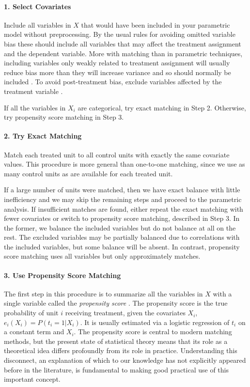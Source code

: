 \documentclass[11pt,titlepage]{article}
\begin{document}
\paragraph{1. Select Covariates}  
Include all variables in $X$ that would have been included in your
parametric model without preprocessing.  By the usual rules for
avoiding omitted variable bias these should include all variables that
may affect the treatment assignment and the dependent variable.  More
with matching than in parametric techniques, including variables only
weakly related to treatment assignment will usually reduce bias more
than they will increase variance and so should normally be included
\citep{RubTho96, HecIchSmi98}.  To avoid post-treatment bias, exclude
variables affected by the treatment variable
\citep{FraRub02,Greenland03,KinZen04}.

If all the variables in $X_i$ are categorical, try exact matching in
Step 2.  Otherwise, try propensity score matching in Step 3.
\paragraph{2. Try Exact Matching}  
Match each treated unit to all control units with exactly the same
covariate values.  This procedure is more general than one-to-one
matching, since we use as many control units as are available for each
treated unit.

If a large number of units were matched, then we have exact balance
with little inefficiency and we may skip the remaining steps and
proceed to the parametric analysis.  If insufficient matches are
found, either repeat the exact matching with fewer covariates or
switch to propensity score matching, described in Step 3.  In the
former, we balance the included variables but do not balance at all on
the rest.  The excluded variables may be partially balanced due to
correlations with the included variables, but some balance will be
absent.  In contrast, propensity score matching uses all variables
but only approximately matches.

\paragraph{3. Use Propensity Score Matching}  
The first step in this procedure is to summarize all the variables in
$X$ with a single variable called the \emph{propensity score}
\citep{RosRub83}.  The propensity score is the true probability of
unit $i$ receiving treatment, given the covariates $X_i$, $e_i(X_i) =
P(t_i=1 | X_i)$.  It is usually estimated via a logistic regression of
$t_i$ on a constant term and $X_i$.  The propensity score is central
to modern matching methods, but the present state of statistical
theory means that its role as a theoretical idea differs profoundly
from its role in practice.  Understanding this disconnect, an
explanation of which to our knowledge has not explicitly appeared
before in the literature, is fundamental to making good practical use
of this important concept.
\end{document}
